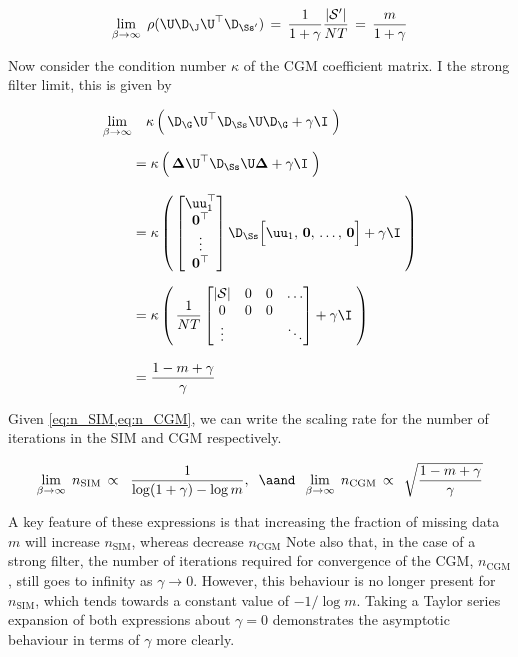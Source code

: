 \begin{equation}
    \label{eq:beta_lim_inf}
    \lim_{\beta \rightarrow \infty} \; \rho(\U \D_\J \U^\top \D_{\Ss'}) \, = \, \frac{1}{1 + \gamma} \frac{|\mathcal{S}'|}{NT} \, = \, \frac{m}{1 + \gamma}
\end{equation}

Now consider the condition number $\kappa$ of the CGM coefficient matrix. I the strong filter limit, this is given by  

\begin{align}
    \lim_{\beta \rightarrow \infty} & \quad \kappa \left(  \, \D_\G \U^\top \D_{\Ss} \U \D_\G + \gamma \I \; \right)  \notag \\[0.2cm]
    &= \kappa  \left(  \, \mathbf{\Delta} \U^\top \D_{\Ss} \U \mathbf{\Delta}  + \gamma \I \; \right) \notag \\[0.3cm]
    &= \kappa  \left(  \, 
    \begin{bmatrix} 
        \uu_1^\top \\ 
        \mathbf{0}^\top \\
        \vdots \\ 
        \mathbf{0}^\top 
    \end{bmatrix} \D_{\Ss}  \Big[ \uu_1, \, \mathbf{0}, \, \dots, \,\mathbf{0} \Big]
    + \gamma \I \; \right) \notag \\[0.2cm]
    &= \kappa  \left(  \, \frac{1}{NT}  \begin{bmatrix}
        |\mathcal{S}| & 0 & 0 & \dots \\
        0 & 0 & 0 &  \\
        \vdots & & & \ddots
    \end{bmatrix}   + \gamma \I \; \right) \notag \\[0.3cm]
    &= \frac{1 - m + \gamma}{\gamma}
\end{align}

Given \cref{eq:n_SIM,eq:n_CGM}, we can write the scaling rate for the number of iterations in the SIM and CGM respectively. 

\begin{equation}
    \label{eq:n_SFL}
    \lim_{\beta \rightarrow \infty} \;  n_\text{SIM} \, \propto \;\;  \frac{1}{\log(1 + \gamma) - \log m}, \;\; \aand \;\;  \lim_{\beta \rightarrow \infty} \;  n_\text{CGM} \, \propto \;\, \sqrt{\frac{1 - m + \gamma}{\gamma}}
\end{equation}


A key feature of these expressions is that increasing the fraction of missing data $m$ will increase $n_\text{SIM}$, whereas decrease $n_\text{CGM}$ Note also that, in the case of a strong filter, the number of iterations required for convergence of the CGM, $n_\text{CGM}$, still goes to infinity as $\gamma \rightarrow 0$. However, this behaviour is no longer present for $n_\text{SIM}$, which tends towards a constant value of $-1/\log m$. Taking a Taylor series expansion of both expressions about $\gamma=0$ demonstrates the asymptotic behaviour in terms of $\gamma$ more clearly. 

